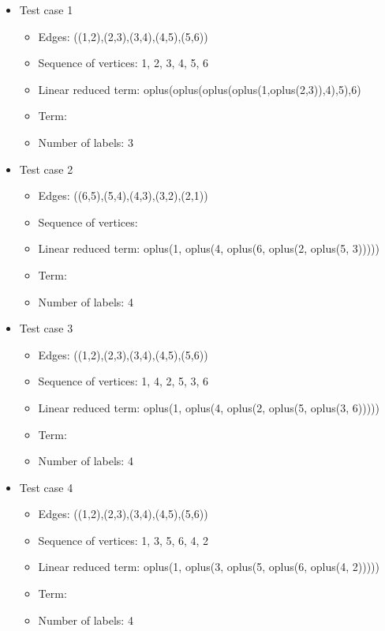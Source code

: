 \documentclass[a4paper, 12pt]{article}
\begin{document}
\begin{itemize}

\item Test case 1
	\begin{itemize}
		\item Edges: ((1,2),(2,3),(3,4),(4,5),(5,6))
		\item Sequence of vertices: 1, 2, 3, 4, 5, 6
		\item Linear reduced term: oplus(oplus(oplus(oplus(1,oplus(2,3)),4),5),6)
		\item Term: 
		\item Number of labels: 3
	\end{itemize}

\item Test case 2
	\begin{itemize}
		\item Edges: ((6,5),(5,4),(4,3),(3,2),(2,1))
		\item Sequence of vertices: 
		\item Linear reduced term: oplus(1, oplus(4, oplus(6, oplus(2, oplus(5, 3)))))
		\item Term: 
		\item Number of labels: 4
	\end{itemize}

\item Test case 3
	\begin{itemize}
		\item Edges: ((1,2),(2,3),(3,4),(4,5),(5,6))
		\item Sequence of vertices: 1, 4, 2, 5, 3, 6
		\item Linear reduced term: oplus(1, oplus(4, oplus(2, oplus(5, oplus(3, 6)))))
		\item Term: 
		\item Number of labels: 4
	\end{itemize}

\item Test case 4
	\begin{itemize}
		\item Edges: ((1,2),(2,3),(3,4),(4,5),(5,6))
		\item Sequence of vertices: 1, 3, 5, 6, 4, 2
		\item Linear reduced term: oplus(1, oplus(3, oplus(5, oplus(6, oplus(4, 2)))))
		\item Term: 
		\item Number of labels: 4
	\end{itemize}


\end{itemize}
\end{document}
